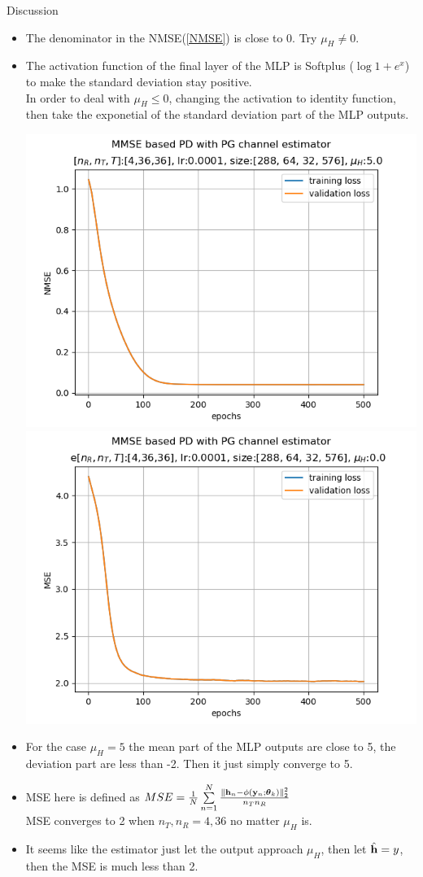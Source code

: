 \documentclass[hyperref={bookmarks=false}]{beamer}
\numberwithin{figure}{section}
\begin{document}
\begin{frame}[allowframebreaks]{Discussion}
\begin{itemize}
  \item The denominator in the NMSE(\ref{NMSE}) is close to 0.
    Try $\mu_H \neq 0$.
  \item The activation function of the final layer of the MLP is Softplus
    ($\log{1+e^x}$) to make the standard deviation stay positive.\\
    In order to deal with $\mu_H \leq 0$, changing the activation to identity 
    function, then take the exponetial of the standard deviation part of the
    MLP outputs.
    \begin{center}
      \includegraphics[width=0.45\linewidth]{figures/240509/lr0.0001_[288, 64, 32, 576]_ep500_mu5.0.png}
      \includegraphics[width=0.45\linewidth]{figures/240509/elr0.0001_[288, 64, 32, 576]_ep500_mu0.0.png}
    \end{center}

  \framebreak

  \item For the case $\mu_H = 5$ the mean part of the MLP outputs are close to 5, 
    the deviation part are less than -2. Then it just simply converge to 5.
  \item MSE here is defined as 
    $MSE=\frac{1}{N} \sum\limits_{n=1}^N
    \frac{\left\| {\bf h}_n-\phi(\mathbf{y}_n;\boldsymbol{\theta}_k) \right\|^2_2}
    {n_Tn_R}$\\
    MSE converges to 2 when $n_T, n_R = 4, 36$ no matter $\mu_H$ is.
  \item It seems like the estimator just let the output approach $\mu_H$,
    then let $\hat{{\bf h}} = y$, then the MSE is much less than 2. 
\end{itemize}

\end{frame}
\end{document}
